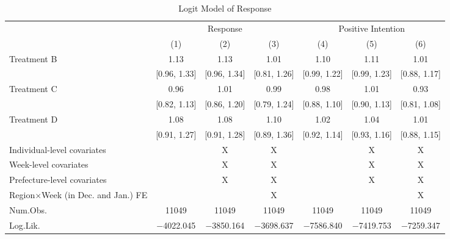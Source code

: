 \documentclass[12pt, a4paper]{article}
\begin{document}
\begin{table}[H]
\begin{threeparttable}
\begin{tablenotes}
\end{tablenotes}
\end{threeparttable}
\end{table}

\begin{landscape}\begin{table}[H]

\caption{\label{tab:reply-logit}Logit Model of Response}
\centering
\fontsize{8}{10}\selectfont
\begin{threeparttable}
\begin{tabular}[t]{lcccccc}
\toprule
\multicolumn{1}{c}{ } & \multicolumn{3}{c}{Response} & \multicolumn{3}{c}{Positive Intention} \\
\cmidrule(l{3pt}r{3pt}){2-4} \cmidrule(l{3pt}r{3pt}){5-7}
  & (1) & (2) & (3) & (4) & (5) & (6)\\
\midrule
Treatment B & \num{1.13} & \num{1.13} & \num{1.01} & \num{1.10} & \num{1.11} & \num{1.01}\\
 & {}[\num{0.96}, \num{1.33}] & {}[\num{0.96}, \num{1.34}] & {}[\num{0.81}, \num{1.26}] & {}[\num{0.99}, \num{1.22}] & {}[\num{0.99}, \num{1.23}] & {}[\num{0.88}, \num{1.17}]\\
Treatment C & \num{0.96} & \num{1.01} & \num{0.99} & \num{0.98} & \num{1.01} & \num{0.93}\\
 & {}[\num{0.82}, \num{1.13}] & {}[\num{0.86}, \num{1.20}] & {}[\num{0.79}, \num{1.24}] & {}[\num{0.88}, \num{1.10}] & {}[\num{0.90}, \num{1.13}] & {}[\num{0.81}, \num{1.08}]\\
Treatment D & \num{1.08} & \num{1.08} & \num{1.10} & \num{1.02} & \num{1.04} & \num{1.01}\\
 & {}[\num{0.91}, \num{1.27}] & {}[\num{0.91}, \num{1.28}] & {}[\num{0.89}, \num{1.36}] & {}[\num{0.92}, \num{1.14}] & {}[\num{0.93}, \num{1.16}] & {}[\num{0.88}, \num{1.15}]\\
\midrule
Individual-level covariates &  & X & X &  & X & X\\
Week-level covariates &  & X & X &  & X & X\\
Prefecture-level covariates &  & X & X &  & X & X\\
Region$\times$Week (in Dec. and Jan.) FE &  &  & X &  &  & X\\
Num.Obs. & \num{11049} & \num{11049} & \num{11049} & \num{11049} & \num{11049} & \num{11049}\\
Log.Lik. & \num{-4022.045} & \num{-3850.164} & \num{-3698.637} & \num{-7586.840} & \num{-7419.753} & \num{-7259.347}\\

\end{tabular}
\end{threeparttable}
\end{table}
\end{landscape}
\end{document}
